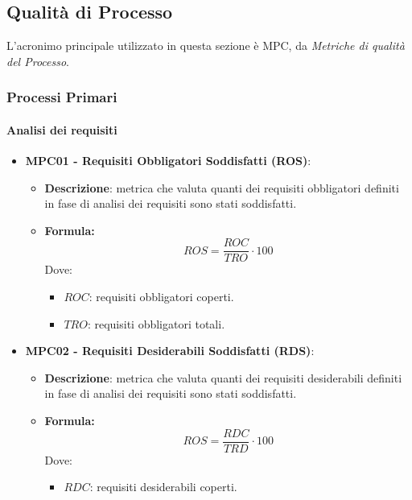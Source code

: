 \documentclass[10pt]{article}
\begin{document}
\begin{justify}
\subsection{Qualità di Processo}
L'acronimo principale utilizzato in questa sezione è MPC, da \textit{Metriche di qualità del Processo}.

\subsubsection{Processi Primari}
\paragraph{Analisi dei requisiti}
\begin{itemize}
    \item   \textbf{MPC01 - Requisiti Obbligatori Soddisfatti (ROS)}:
            \begin{itemize}
                \item   \textbf{Descrizione}: metrica che valuta quanti dei requisiti obbligatori definiti in fase di analisi dei requisiti sono stati soddisfatti.
                \item   \textbf{Formula:}
                        \[
                        ROS = \frac{ROC}{TRO} \cdot 100
                        \]
                        Dove:
                        \begin{itemize}
                            \item $ROC$: requisiti obbligatori coperti.
                            \item $TRO$: requisiti obbligatori totali.
                        \end{itemize}
            \end{itemize}
    \item   \textbf{MPC02 - Requisiti Desiderabili Soddisfatti (RDS)}:
            \begin{itemize}
                \item   \textbf{Descrizione}: metrica che valuta quanti dei requisiti desiderabili definiti in fase di analisi dei requisiti sono stati soddisfatti.
                \item   \textbf{Formula:}
                        \[
                        ROS = \frac{RDC}{TRD} \cdot 100
                        \]
                        Dove:
                        \begin{itemize}
                            \item $RDC$: requisiti desiderabili coperti.

\end{itemize}
\end{itemize}
\end{itemize}
\end{justify}
\end{document}
